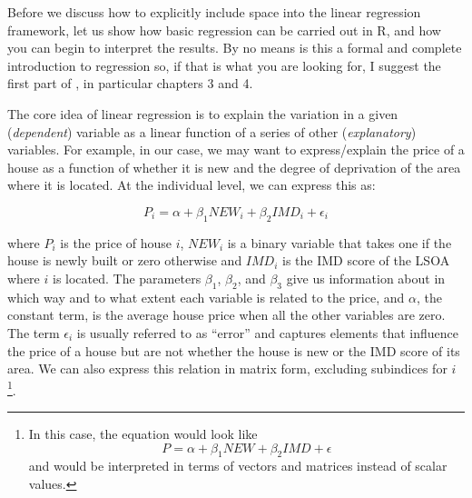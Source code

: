 \documentclass[]{book}
\begin{document}
Before we discuss how to explicitly include space into the linear
regression framework, let us show how basic regression can be carried
out in R, and how you can begin to interpret the results. By no means is
this a formal and complete introduction to regression so, if that is
what you are looking for, I suggest the first part of
\citet{gelman2006data}, in particular chapters 3 and 4.

The core idea of linear regression is to explain the variation in a
given (\emph{dependent}) variable as a linear function of a series of
other (\emph{explanatory}) variables. For example, in our case, we may
want to express/explain the price of a house as a function of whether it
is new and the degree of deprivation of the area where it is located. At
the individual level, we can express this as:

\[
P_i = \alpha + \beta_1 NEW_i + \beta_2 IMD_i + \epsilon_i
\]

where \(P_i\) is the price of house \(i\), \(NEW_i\) is a binary
variable that takes one if the house is newly built or zero otherwise
and \(IMD_i\) is the IMD score of the LSOA where \(i\) is located. The
parameters \(\beta_1\), \(\beta_2\), and \(\beta_3\) give us information
about in which way and to what extent each variable is related to the
price, and \(\alpha\), the constant term, is the average house price
when all the other variables are zero. The term \(\epsilon_i\) is
usually referred to as ``error'' and captures elements that influence
the price of a house but are not whether the house is new or the IMD
score of its area. We can also express this relation in matrix form,
excluding subindices for \(i\)\footnote{In this case, the equation would
  look like \[P = \alpha + \beta_1 NEW + \beta_2 IMD + \epsilon\] and
  would be interpreted in terms of vectors and matrices instead of
  scalar values.}.
\end{document}
